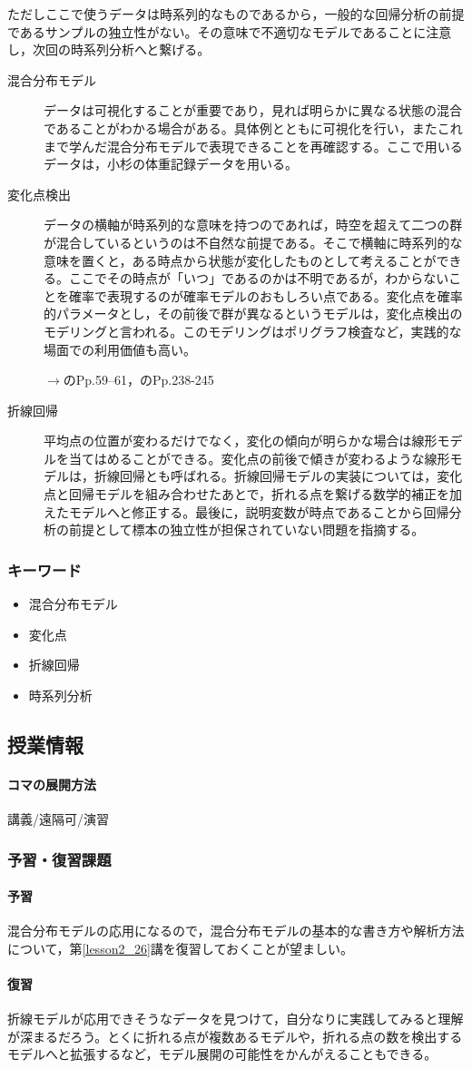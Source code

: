 ただしここで使うデータは時系列的なものであるから，一般的な回帰分析の前提であるサンプルの独立性がない。その意味で不適切なモデルであることに注意し，次回の時系列分析へと繋げる。
\begin{description}
    \item[混合分布モデル] データは可視化することが重要であり，見れば明らかに異なる状態の混合であることがわかる場合がある。具体例とともに可視化を行い，またこれまで学んだ混合分布モデルで表現できることを再確認する。ここで用いるデータは，小杉の体重記録データを用いる。
    \item[変化点検出] データの横軸が時系列的な意味を持つのであれば，時空を超えて二つの群が混合しているというのは不自然な前提である。そこで横軸に時系列的な意味を置くと，ある時点から状態が変化したものとして考えることができる。ここでその時点が「いつ」であるのかは不明であるが，わからないことを確率で表現するのが確率モデルのおもしろい点である。変化点を確率的パラメータとし，その前後で群が異なるというモデルは，変化点検出のモデリングと言われる。このモデリングはポリグラフ検査など，実践的な場面での利用価値も高い。
        \begin{flushright}
            $\to$\citet{Lee201709}のPp.59--61，\citet{松浦201610}のPp.238-245
        \end{flushright}
    \item[折線回帰] 平均点の位置が変わるだけでなく，変化の傾向が明らかな場合は線形モデルを当てはめることができる。変化点の前後で傾きが変わるような線形モデルは，折線回帰とも呼ばれる。折線回帰モデルの実装については，変化点と回帰モデルを組み合わせたあとで，折れる点を繋げる数学的補正を加えたモデルへと修正する。最後に，説明変数が時点であることから回帰分析の前提として標本の独立性が担保されていない問題を指摘する。
\end{description}
\subsubsection{キーワード}
\begin{itemize}
    \item 混合分布モデル
    \item 変化点
    \item 折線回帰
    \item 時系列分析
\end{itemize}
\subsection{授業情報}
\paragraph{コマの展開方法}
講義/遠隔可/演習
\subsubsection{予習・復習課題}
\paragraph{予習}混合分布モデルの応用になるので，混合分布モデルの基本的な書き方や解析方法について，第\ref{lesson2_26}講を復習しておくことが望ましい。
\paragraph{復習}折線モデルが応用できそうなデータを見つけて，自分なりに実践してみると理解が深まるだろう。とくに折れる点が複数あるモデルや，折れる点の数を検出するモデルへと拡張するなど，モデル展開の可能性をかんがえることもできる。